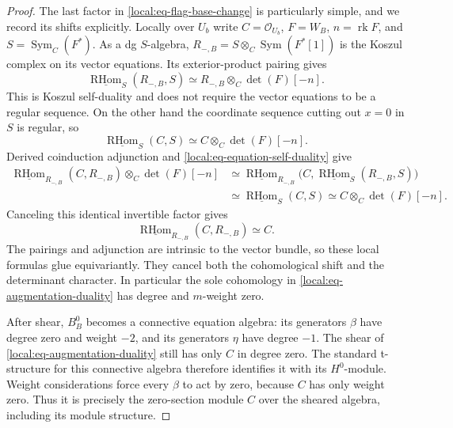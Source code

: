 \documentclass[11pt]{article}
\numberwithin{equation}{section}
\theoremstyle{definition}
\theoremstyle{remark}
\newcommand{\cO}{\mathcal O}
\newcommand{\RHom}{\operatorname{RHom}}
\newcommand{\Sym}{\operatorname{Sym}}
\newcommand{\rk}{\operatorname{rk}}
\begin{document}
\begin{proof}
The last factor in \eqref{local:eq-flag-base-change} is particularly
simple, and we record its shifts explicitly.  Locally over $U_b$
write $C=\cO_{U_b}$, $F=W_B$, $n=\rk F$, and
$S=\Sym_C(F^*)$.  As a dg $S$-algebra,
$R_{-,B}=S\otimes_C\Sym(F^*[1])$ is the Koszul complex on its
vector equations.  Its exterior-product pairing gives
\begin{equation}\label{local:eq-equation-self-duality}
 \underline{\RHom}_S(R_{-,B},S)
       \simeq R_{-,B}\otimes_C\det(F)[-n].
\end{equation}
This is Koszul self-duality and does not require the vector
equations to be a regular sequence.  On the other hand the
coordinate sequence cutting out $x=0$ in $S$ is regular, so
\begin{equation}\label{local:eq-zero-section-duality}
 \underline{\RHom}_S(C,S)\simeq C\otimes_C\det(F)[-n].
\end{equation}
Derived coinduction adjunction and
\eqref{local:eq-equation-self-duality} give
\begin{align*}
 \underline{\RHom}_{R_{-,B}}(C,R_{-,B})
                         \otimes_C\det(F)[-n]
 &\simeq
 \underline{\RHom}_{R_{-,B}}
       \bigl(C,\underline{\RHom}_S(R_{-,B},S)\bigr)\\
 &\simeq\underline{\RHom}_S(C,S)
 \simeq C\otimes_C\det(F)[-n].
\end{align*}
Canceling this identical invertible factor gives
\begin{equation}\label{local:eq-augmentation-duality}
 \underline{\RHom}_{R_{-,B}}(C,R_{-,B})\simeq C.
\end{equation}
The pairings and adjunction are intrinsic to the vector bundle,
so these local formulas glue equivariantly.  They cancel both the
cohomological shift and the determinant character.  In particular
the sole cohomology in \eqref{local:eq-augmentation-duality} has
degree and $m$-weight zero.

After shear, $B_B^0$ becomes a connective equation algebra: its
generators $\beta$ have degree zero and weight $-2$, and its
generators $\eta$ have degree $-1$.  The shear of
\eqref{local:eq-augmentation-duality} still has only $C$ in
degree zero.  The standard t-structure for this connective algebra
therefore identifies it with its $H^0$-module.  Weight considerations
force every $\beta$ to act by zero, because $C$ has only weight
zero.  Thus it is precisely the zero-section module $C$ over the
sheared algebra, including its module structure.


\end{proof}
\end{document}
